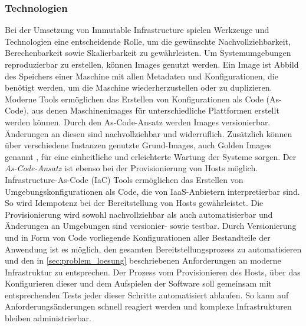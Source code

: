 \documentclass[11pt]{scrartcl}
\begin{document}
\subsubsection{Technologien} 
Bei der Umsetzung von Immutable Infrastructure spielen Werkzeuge und Technologien eine entscheidende Rolle, um die gewünschte Nachvollziehbarkeit, Berechenbarkeit sowie Skalierbarkeit zu gewährleisten. \newline 
Um Systemumgebungen reproduzierbar zu erstellen, können Images genutzt werden. Ein Image ist Abbild des Speichers einer Maschine mit allen Metadaten und Konfigurationen, die benötigt werden, um die Maschine wiederherzustellen oder zu duplizieren. %
Moderne Tools ermöglichen das Erstellen von Konfigurationen als Code (As-Code), aus denen Maschinenimages für unterschiedliche Plattformen erstellt werden können. Durch den \glqq As-Code\grqq{}-Ansatz werden Images versionierbar.%
Änderungen an diesen sind nachvollziehbar und widerruflich. Zusätzlich können über verschiedene Instanzen genutzte Grund-Images, auch Golden Images genannt \cite{GoldenImage:2018}, für eine einheitliche und erleichterte Wartung der Systeme sorgen. 
\newline
Der \textit{As-Code-Ansatz } ist ebenso bei der Provisionierung von Hosts möglich. Infrastructure-As-Code (IaC) Tools ermöglichen das Erstellen von Umgebungskonfigurationen als Code, die von IaaS-Anbietern interpretierbar sind. So wird Idempotenz bei der Bereitstellung von Hosts gewährleistet. Die Provisionierung wird sowohl nachvollziehbar als auch automatisierbar und Änderungen an Umgebungen sind versionier- sowie testbar.
Durch Versionierung und in Form von Code vorliegende Konfigurationen aller Bestandteile der Anwendung ist es möglich, den gesamten Bereitstellungsprozess zu automatisieren und den in \cref{sec:problem_loesung} beschriebenen Anforderungen an moderne Infrastruktur zu entsprechen. Der Prozess vom Provisionieren des Hosts, über das Konfigurieren dieser und dem Aufspielen der Software soll gemeinsam mit entsprechenden Tests jeder dieser Schritte automatisiert ablaufen. So kann auf Anforderungsänderungen schnell reagiert werden und komplexe Infrastrukturen bleiben administrierbar.
\end{document}
